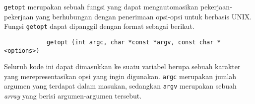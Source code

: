 \verb|getopt| merupakan sebuah fungsi yang dapat mengautomasikan pekerjaan-pekerjaan yang berhubungan dengan penerimaan opsi-opsi untuk \cl\xspace berbasis UNIX.
\newline\newline\noindent
Fungsi \verb|getopt| dapat dipanggil dengan format sebagai berikut.

\begin{verbatim}
            getopt (int argc, char *const *argv, const char *<options>)
\end{verbatim}

Seluruh kode ini dapat dimasukkan ke suatu variabel berupa sebuah karakter yang merepresentasikan opsi yang ingin digunakan. \verb|argc| merupakan jumlah argumen yang terdapat dalam masukan, sedangkan \verb|argv| merupakan sebuah \textit{array} yang berisi argumen-argumen tersebut.

